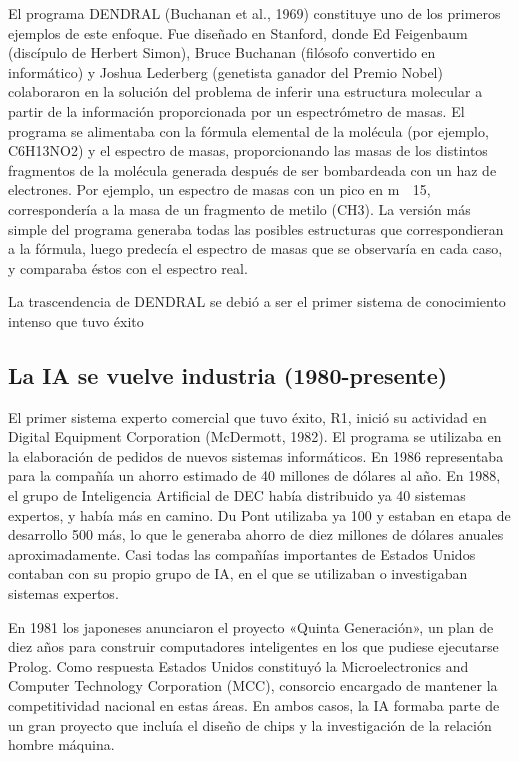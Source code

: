 \documentclass{article}
\begin{document}
El programa DENDRAL (Buchanan et al., 1969) constituye uno de los primeros ejemplos de este enfoque. Fue diseñado en Stanford, donde Ed Feigenbaum (discípulo de Herbert Simon), Bruce Buchanan (filósofo convertido en informático) y Joshua Lederberg (genetista ganador del Premio Nobel) colaboraron en la solución del problema de inferir una estructura molecular a partir de la información proporcionada por un espectrómetro de masas. El programa se alimentaba con la fórmula elemental de la molécula (por ejemplo, C6H13NO2) y el espectro de masas, proporcionando las masas de los distintos fragmentos de la molécula generada después de ser bombardeada con un haz de electrones. Por ejemplo, un espectro de masas con un pico en m  15, correspondería a la masa de un fragmento de metilo (CH3). La versión más simple del programa generaba todas las posibles estructuras que correspondieran a la fórmula, luego predecía el espectro de masas que se observaría en cada caso, y comparaba éstos con el espectro real.

La trascendencia de DENDRAL se debió a ser el primer sistema de conocimiento intenso que tuvo éxito

\subsection{La IA se vuelve industria (1980-presente)}

El primer sistema experto comercial que tuvo éxito, R1, inició su actividad en Digital Equipment Corporation (McDermott, 1982). El programa se utilizaba en la elaboración de pedidos de nuevos sistemas informáticos. En 1986 representaba para la compañía un ahorro estimado de 40 millones de dólares al año. En 1988, el grupo de Inteligencia Artificial de DEC había distribuido ya 40 sistemas expertos, y había más en camino. Du Pont utilizaba ya 100 y estaban en etapa de desarrollo 500 más, lo que le generaba ahorro de diez millones de dólares anuales aproximadamente.  Casi todas las compañías importantes de Estados Unidos contaban con su propio grupo de IA, en el que se utilizaban o investigaban sistemas expertos.

En 1981 los japoneses anunciaron el proyecto «Quinta Generación», un plan de diez años para construir computadores inteligentes en los que pudiese ejecutarse Prolog. Como respuesta Estados Unidos constituyó la Microelectronics and Computer Technology Corporation (MCC), consorcio encargado de mantener la competitividad nacional en estas áreas. En ambos casos, la IA formaba parte de un gran proyecto que incluía el diseño de chips y la investigación de la relación hombre máquina. 
\end{document}
